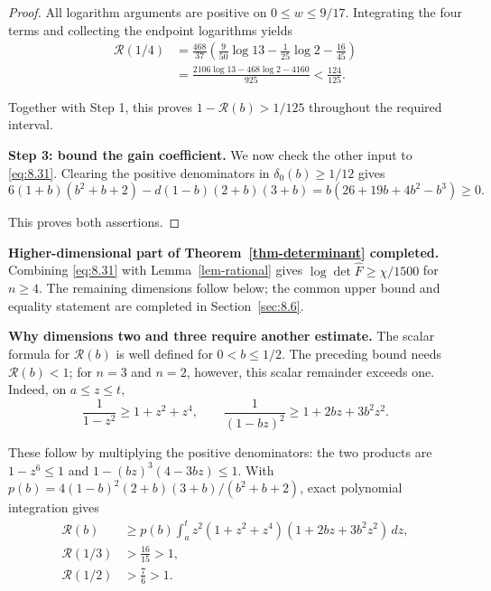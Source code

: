 \begin{proof}
All logarithm arguments are positive on $0\le w\le9/17$.
Integrating the four terms and collecting the endpoint logarithms yields
\begin{equation}\label{eq:8.36}
\begin{aligned}
\mathcal R(1/4)
&=\frac{468}{37}
\left(\frac9{50}\log13-\frac1{25}\log2-\frac{16}{45}\right)\\
&=\frac{2106\log13-468\log2-4160}{925}<\frac{124}{125}.
\end{aligned}
\end{equation}

Together with Step 1, this proves $1-\mathcal R(b)>1/125$ throughout the
required interval.

\textbf{Step 3: bound the gain coefficient.} We now check the other input to \eqref{eq:8.31}.
Clearing the positive denominators in $\delta_0(b)\ge1/12$ gives
\begin{equation}\label{eq:8.37}
6(1+b)(b^2+b+2)-d(1-b)(2+b)(3+b)
=b(26+19b+4b^2-b^3)\ge0.
\end{equation}

This proves both assertions. 
\end{proof}

\textbf{Higher-dimensional part of Theorem~\ref{thm-determinant} completed.} Combining \eqref{eq:8.31} with
Lemma~\ref{lem-rational} gives $\log\det\widehat F\ge\chi/1500$ for $n\ge4$.
The remaining dimensions follow below; the common upper bound and equality
statement are completed in Section~\ref{sec:8.6}.

\textbf{Why dimensions two and three require another estimate.} The scalar formula for
$\mathcal R(b)$ is well defined for $0<b\le1/2$. The preceding bound needs
$\mathcal R(b)<1$; for $n=3$ and $n=2$, however, this scalar remainder exceeds one.
Indeed, on $a\le z\le t$,
\begin{equation}\label{eq:8.38}
\frac1{1-z^2}\ge1+z^2+z^4,\qquad
\frac1{(1-bz)^2}\ge1+2bz+3b^2z^2.
\end{equation}

These follow by multiplying the positive denominators: the two products are
$1-z^6\le1$ and $1-(bz)^3(4-3bz)\le1$. With
$p(b)=4(1-b)^2(2+b)(3+b)/(b^2+b+2)$, exact polynomial integration gives
\begin{equation}\label{eq:8.39}
\begin{aligned}
\mathcal R(b)&\ge p(b)\int_a^t
z^2(1+z^2+z^4)(1+2bz+3b^2z^2)\,dz,\\
\mathcal R(1/3)&>\frac{16}{15}>1,\\
\mathcal R(1/2)&>\frac76>1.
\end{aligned}
\end{equation}

